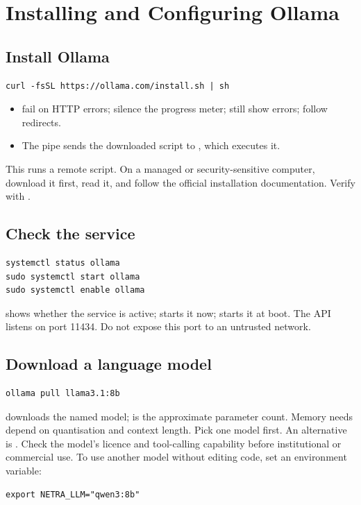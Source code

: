 \chapter{Installing and Configuring Ollama}
\section{Install Ollama}
\begin{lstlisting}[style=sh]
curl -fsSL https://ollama.com/install.sh | sh
\end{lstlisting}
\begin{itemize}
  \item {} fail on HTTP errors;  silence the progress meter;  still show errors;  follow redirects.
  \item The pipe \code{|} sends the downloaded script to , which executes it.
\end{itemize}
This runs a remote script. On a managed or security-sensitive computer, download it first, read it, and follow the official installation documentation. Verify with .

\section{Check the service}
\begin{lstlisting}[style=sh]
systemctl status ollama
sudo systemctl start ollama
sudo systemctl enable ollama
\end{lstlisting}
 shows whether the service is active;  starts it now;  starts it at boot. The API listens on port 11434. Do not expose this port to an untrusted network.

\section{Download a language model}
\begin{lstlisting}[style=sh]
ollama pull llama3.1:8b
\end{lstlisting}
 downloads the named model;  is the approximate parameter count. Memory needs depend on quantisation and context length. Pick one model first. An alternative is . Check the model's licence and tool-calling capability before institutional or commercial use. To use another model without editing code, set an environment variable:
\begin{lstlisting}[style=sh]
export NETRA_LLM="qwen3:8b"
\end{lstlisting}

